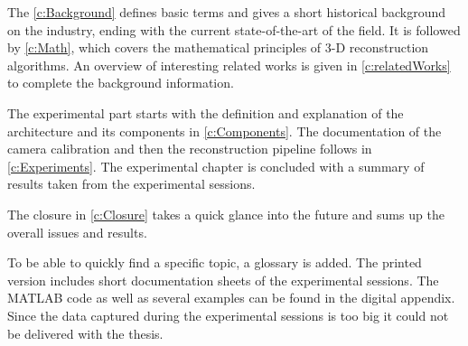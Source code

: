 The \autoref{c:Background} defines basic terms and gives a short historical background on the industry, ending with the current state-of-the-art of the field. It is followed by \autoref{c:Math}, which covers the mathematical principles of 3-D reconstruction algorithms. An overview of interesting related works is given in \autoref{c:relatedWorks} to complete the background information.

The experimental part starts with the definition and explanation of the architecture and its components in \autoref{c:Components}. The documentation of the camera calibration and then the reconstruction pipeline follows in \autoref{c:Experiments}. The experimental chapter is concluded with a summary of results taken from the experimental sessions.

The closure in \autoref{c:Closure} takes a quick glance into the future and sums up the overall issues and results.

To be able to quickly find a specific topic, a glossary is added. The printed version includes short documentation sheets of the experimental sessions. The MATLAB code as well as several examples can be found in the digital appendix. Since the data captured during the experimental sessions is too big it could not be delivered with the thesis.